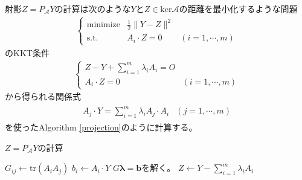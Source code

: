 射影$Z = P_\mathcal{A} Y$の計算は次のような$Y$と$Z \in \mathrm{ker} \mathcal{A}$の距離を最小化するような問題
\begin{align*}
  \left\{
    \begin{array}{lll}
      \text{minimize} & \displaystyle{\frac{1}{2}} \|Y - Z\|^2 & \\
      \text{s.t.}     & A_i \cdot Z = 0         & (i = 1, \cdots, m)
    \end{array}
  \right.
\end{align*}
のKKT条件
\begin{align*}
  \left\{
    \begin{array}{ll}
      Z - Y + \displaystyle{\sum_{i = 1}^m} \lambda_i A_i = O & \\
      A_i \cdot Z = 0                                         & (i = 1, \cdots, m)
    \end{array}
  \right.
\end{align*}
から得られる関係式
\begin{align*}
  \begin{array}{ll}
    A_j \cdot Y = \displaystyle{\sum_{i = 1}^m} \lambda_i A_j \cdot A_i & (j = 1, \cdots, m)
  \end{array}
\end{align*}
を使ったAlgorithm \ref{projection}のように計算する。
\begin{algorithm}
  \caption{$Z = P_\mathcal{A} Y$の計算}
  \label{projection}
  \begin{algorithmic}[1]
        \State $G_{i j} \leftarrow \mathrm{tr}(A_i A_j)$
      \EndFor
    \EndFor
      \State $b_i \leftarrow A_i \cdot Y$
    \EndFor
    \State $G {\bm \lambda} = \mathbf{b}$を解く。
    \State \Return $Z \leftarrow Y - \displaystyle{\sum_{i = 1}^m \lambda_i A_i}$
  \end{algorithmic}
\end{algorithm}

